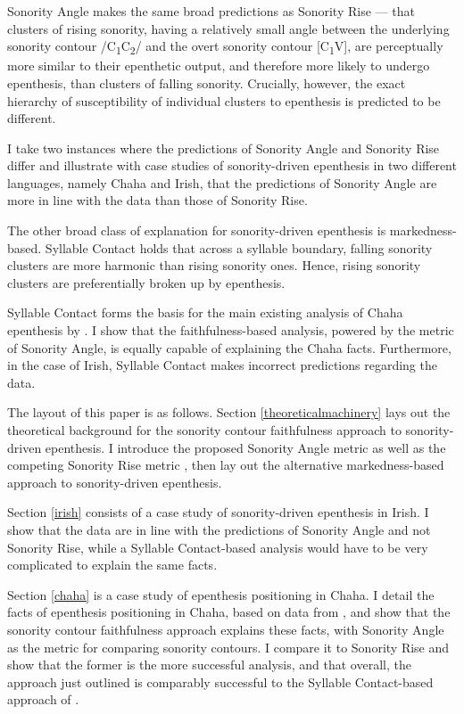 \documentclass[12pt]{article}
\begin{document}
{\sc Sonority Angle} makes the same broad predictions as {\sc Sonority Rise} --- that clusters of rising sonority, having a relatively small angle between the underlying sonority contour /C\textsubscript{1}C\textsubscript{2}/ and the overt sonority contour [C\textsubscript{1}V], are perceptually more similar to their epenthetic output, and therefore more likely to undergo epenthesis, than clusters of falling sonority. Crucially, however, the exact hierarchy of susceptibility of individual clusters to epenthesis is predicted to be different.

I take two instances where the predictions of {\sc Sonority Angle} and {\sc Sonority Rise} differ and illustrate with case studies of sonority-driven epenthesis in two different languages, namely Chaha and Irish, that the predictions of {\sc Sonority Angle} are more in line with the data than those of {\sc Sonority Rise}.

\bigskip

The other broad class of explanation for sonority-driven epenthesis is markedness-based.  Syllable Contact \citep{murray.vennemann.1983} holds that across a syllable boundary, falling sonority clusters are more harmonic than rising sonority ones.  Hence, rising sonority clusters are preferentially broken up by epenthesis.

Syllable Contact forms the basis for the main existing analysis of Chaha epenthesis by \citet{rose.2000}.  I show that the faithfulness-based analysis, powered by the metric of {\sc Sonority Angle}, is equally capable of explaining the Chaha facts. Furthermore, in the case of Irish, Syllable Contact makes incorrect predictions regarding the data.

\bigskip

The layout of this paper is as follows.  Section \ref{theoreticalmachinery} lays out the theoretical background for the sonority contour faithfulness approach to 
sonority-driven epenthesis. I introduce the proposed {\sc Sonority Angle} metric as well as the competing {\sc Sonority Rise} metric \citep{flemming.2008}, 
then lay out the alternative markedness-based approach to sonority-driven epenthesis.

Section \ref{irish} consists of a case study of sonority-driven epenthesis in Irish.  I show that the data are in line with the predictions of {\sc Sonority Angle} and not {\sc Sonority Rise}, while a Syllable Contact-based analysis would have to be very complicated to explain the same facts.

Section \ref{chaha} is a case study of epenthesis positioning in Chaha.  I detail the facts of epenthesis positioning in Chaha, based on data from \cite{rose.2000},
and show that the sonority contour faithfulness approach explains these facts, with {\sc Sonority Angle} as the metric for comparing sonority contours.  I compare it to {\sc Sonority Rise} and show that the former is the more successful analysis, and that overall, the approach just outlined is comparably successful to the Syllable Contact-based approach of \citet{rose.2000}.
\end{document}
